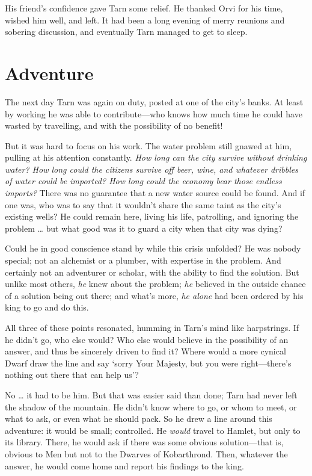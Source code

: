 His friend's confidence gave Tarn some relief.  He thanked Orvi for his time, wished him well, and left.  It had been a long evening of merry reunions and sobering discussion, and eventually Tarn managed to get to sleep.

\chapter{Adventure}

The next day Tarn was again on duty, posted at one of the city's banks.  At least by working he was able to contribute---who knows how much time he could have wasted by travelling, and with the possibility of no benefit!

But it was hard to focus on his work.  The water problem still gnawed at him, pulling at his attention constantly.  \emph{How long can the city survive without drinking water?  How long could the citizens survive off beer, wine, and whatever dribbles of water could be imported?  How long could the economy bear those endless imports?}  There was no guarantee that a new water source could be found.  And if one was, who was to say that it wouldn't share the same taint as the city's existing wells?  He could remain here, living his life, patrolling, and ignoring the problem \ldots{} but what good was it to guard a city when that city was dying?

Could he in good conscience stand by while this crisis unfolded?  He was nobody special; not an alchemist or a plumber, with expertise in the problem.  And certainly not an adventurer or scholar, with the ability to find the solution. But unlike most others, \emph{he} knew about the problem; \emph{he} believed in the outside chance of a solution being out there; and what's more, \emph{he alone} had been ordered by his king to go and do this.

All three of these points resonated, humming in Tarn's mind like harpstrings.  If he didn't go, who else would?  Who else would believe in the possibility of an answer, and thus be sincerely driven to find it?  Where would a more cynical Dwarf draw the line and say `sorry Your Majesty, but you were right---there's nothing out there that can help us'?

No \ldots{} it had to be him.  But that was easier said than done; Tarn had never left the shadow of the mountain.  He didn't know where to go, or whom to meet, or what to ask, or even what he should pack.  So he drew a line around this adventure: it would be small; controlled.  He \emph{would} travel to Hamlet, but only to its library.  There, he would ask if there was some obvious solution---that is, obvious to Men but not to the Dwarves of Kobarthrond.  Then, whatever the answer, he would come home and report his findings to the king.

